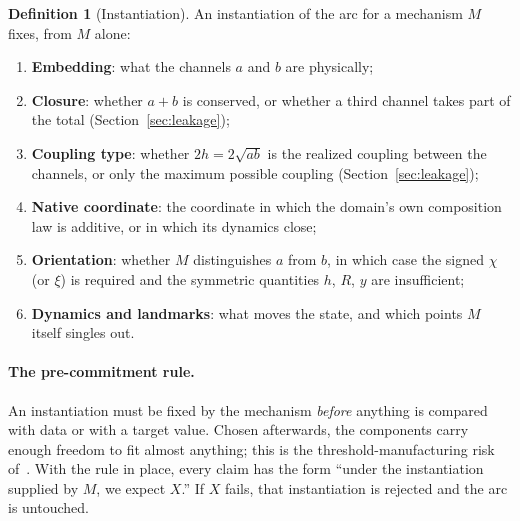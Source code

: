 \documentclass[11pt]{article}
\theoremstyle{definition}
\newtheorem{definition}{Definition}
\theoremstyle{remark}
\begin{document}
\begin{definition}[Instantiation]\label{def:inst}
An instantiation of the arc for a mechanism $M$ fixes, from $M$ alone:
\begin{enumerate}[label=(\roman*)]
\item \textbf{Embedding}: what the channels $a$ and $b$ are physically;
\item \textbf{Closure}: whether $a+b$ is conserved, or whether a third channel takes part of
the total (Section~\ref{sec:leakage});
\item \textbf{Coupling type}: whether $2h=2\sqrt{ab}$ is the realized coupling between the
channels, or only the maximum possible coupling (Section~\ref{sec:leakage});
\item \textbf{Native coordinate}: the coordinate in which the domain's own composition law
is additive, or in which its dynamics close;
\item \textbf{Orientation}: whether $M$ distinguishes $a$ from $b$, in which case the signed
$\chi$ (or $\xi$) is required and the symmetric quantities $h$, $R$, $y$ are insufficient;
\item \textbf{Dynamics and landmarks}: what moves the state, and which points $M$ itself
singles out.
\end{enumerate}
\end{definition}

\paragraph{The pre-commitment rule.} An instantiation must be fixed by the mechanism
\emph{before} anything is compared with data or with a target value. Chosen afterwards, the
components carry enough freedom to fit almost anything; this is the threshold-manufacturing
risk of~\cite{DeJesus2026CG}. With the rule in place, every claim has the form ``under the
instantiation supplied by $M$, we expect $X$.'' If $X$ fails, that instantiation is rejected
and the arc is untouched.
\end{document}
